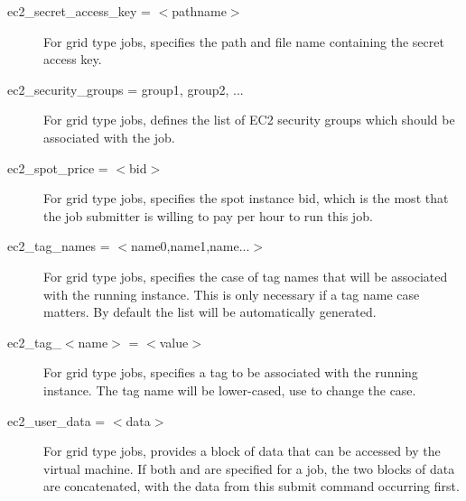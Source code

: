 \begin{description}
\label{condor-submit-ec2-access-key}
\item[ec2\_secret\_access\_key = $<$pathname$>$]
For grid type  jobs,
specifies the path and file name containing the secret access key.


\label{condor-submit-ec2-security-groups}
\item[ec2\_security\_groups = group1, group2, ...]
For grid type  jobs, 
defines the list of EC2 security groups which
should be associated with the job.


\label{condor-submit-ec2-spot-price}
\item[ec2\_spot\_price = $<$bid$>$]
For grid type  jobs, 
specifies the spot instance bid, which is the most that the job submitter
is willing to pay per hour to run this job.


\label{condor-submit-ec2-tag-names}
\item[ec2\_tag\_names = $<$name0,name1,name...$>$]
For grid type  jobs, 
specifies the case of tag names that will be associated with the
running instance.
This is only necessary if a tag name case matters.
By default the list will be automatically generated.


\item[ec2\_tag\_$<$name$>$ = $<$value$>$]
For grid type  jobs, 
specifies a tag to be associated with the running instance.
The tag name will be lower-cased, use  to
change the case.


\label{condor-submit-ec2-user-data}
\item[ec2\_user\_data = $<$data$>$]
For grid type  jobs, 
provides a block of data that can be accessed by the virtual machine.
If both  and 
 are specified for a job,
the two blocks of data are concatenated, 
with the data from this  submit command 
occurring first.


\end{description}
